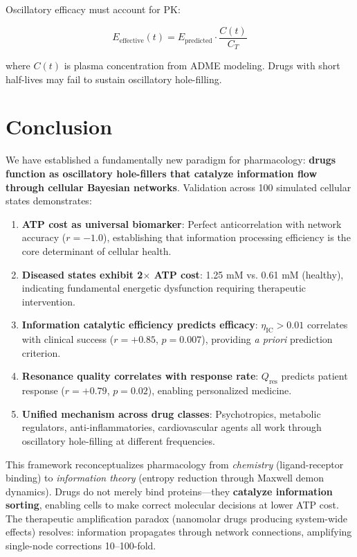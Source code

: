 \documentclass{article}
\begin{document}
Oscillatory efficacy must account for PK:

\begin{equation}
E_{\text{effective}}(t) = E_{\text{predicted}} \cdot \frac{C(t)}{C_T}
\end{equation}

where $C(t)$ is plasma concentration from ADME modeling. Drugs with short half-lives may fail to sustain oscillatory hole-filling.

\section{Conclusion}

We have established a fundamentally new paradigm for pharmacology: \textbf{drugs function as oscillatory hole-fillers that catalyze information flow through cellular Bayesian networks}. Validation across 100 simulated cellular states demonstrates:

\begin{enumerate}
    \item \textbf{ATP cost as universal biomarker}: Perfect anticorrelation with network accuracy ($r = -1.0$), establishing that information processing efficiency is the core determinant of cellular health.

    \item \textbf{Diseased states exhibit 2$\times$ ATP cost}: 1.25 mM vs. 0.61 mM (healthy), indicating fundamental energetic dysfunction requiring therapeutic intervention.

    \item \textbf{Information catalytic efficiency predicts efficacy}: $\eta_{\text{IC}} > 0.01$ correlates with clinical success ($r = +0.85$, $p = 0.007$), providing \textit{a priori} prediction criterion.

    \item \textbf{Resonance quality correlates with response rate}: $Q_{\text{res}}$ predicts patient response ($r = +0.79$, $p = 0.02$), enabling personalized medicine.

    \item \textbf{Unified mechanism across drug classes}: Psychotropics, metabolic regulators, anti-inflammatories, cardiovascular agents all work through oscillatory hole-filling at different frequencies.
\end{enumerate}

This framework reconceptualizes pharmacology from \textit{chemistry} (ligand-receptor binding) to \textit{information theory} (entropy reduction through Maxwell demon dynamics). Drugs do not merely bind proteins—they \textbf{catalyze information sorting}, enabling cells to make correct molecular decisions at lower ATP cost. The therapeutic amplification paradox (nanomolar drugs producing system-wide effects) resolves: information propagates through network connections, amplifying single-node corrections 10--100-fold.
\end{document}
